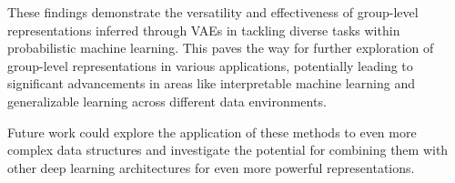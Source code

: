 \documentclass[backrefs]{cam-thesis}
\begin{document}
These findings demonstrate the versatility and effectiveness of group-level representations inferred through VAEs in tackling diverse tasks within probabilistic machine learning. This paves the way for further exploration of group-level representations in various applications, potentially leading to significant advancements in areas like interpretable machine learning and generalizable learning across different data environments. 

Future work could explore the application of these methods to even more complex data structures and investigate the potential for combining them with other deep learning architectures for even more powerful representations. 

%





%     



\end{document}
